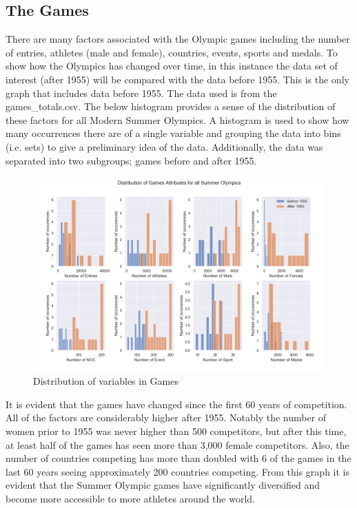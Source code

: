 \documentclass[a4 paper, 12pt]{article}
\begin{document}
    \subsection{The Games}
    There are many factors associated with the Olympic games including the number of entries, athletes (male and female), countries, events, sports and medals. To show how the Olympics has changed over time, in this instance the data set of interest (after 1955) will be compared with the data before 1955. This is the only graph that includes data before 1955. The data used is from the games\_totals.csv. The below histogram provides a sense of the distribution of these factors for all Modern Summer Olympics. A histogram is used to show how many occurrences there are of a single variable and grouping the data into bins (i.e. sets) to give a preliminary idea of the data. Additionally, the data was separated into two subgroups; games before and after 1955.
        \begin{figure} [H]
            \centering
            \includegraphics[width=\textwidth, frame]
                {./images/graph/games_histogram.png}      
                \caption{Distribution of variables in Games} 
        \end{figure}
    It is evident that the games have changed since the first 60 years of competition. All of the factors are considerably higher after 1955. Notably the number of women prior to 1955 was never higher than 500 competitors, but after this time, at least half of the games has seen more than 3,000 female competitors. Also, the number of countries competing has more than doubled with 6 of the games in the last 60 years seeing approximately 200 countries competing. From this graph it is evident that the Summer Olympic games have significantly diversified and become more accessible to more athletes around the world.
\end{document}
